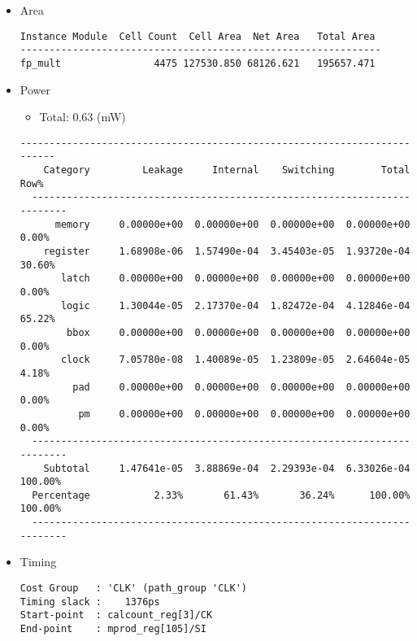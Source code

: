 \documentclass{article}
\begin{document}
            \begin{itemize}
                \item Area
                \begin{lstlisting}[backgroundcolor = \color{white},basicstyle=\small\sffamily]
Instance Module  Cell Count  Cell Area  Net Area   Total Area 
--------------------------------------------------------------
fp_mult                4475 127530.850 68126.621   195657.471 
                \end{lstlisting}
                \item Power
                \begin{itemize}
                    \item Total: 0.63 (mW)
                \end{itemize}
                \begin{lstlisting}[backgroundcolor = \color{white},basicstyle=\small\sffamily]
  -------------------------------------------------------------------------
    Category         Leakage     Internal    Switching        Total    Row%
  -------------------------------------------------------------------------
      memory     0.00000e+00  0.00000e+00  0.00000e+00  0.00000e+00   0.00%
    register     1.68908e-06  1.57490e-04  3.45403e-05  1.93720e-04  30.60%
       latch     0.00000e+00  0.00000e+00  0.00000e+00  0.00000e+00   0.00%
       logic     1.30044e-05  2.17370e-04  1.82472e-04  4.12846e-04  65.22%
        bbox     0.00000e+00  0.00000e+00  0.00000e+00  0.00000e+00   0.00%
       clock     7.05780e-08  1.40089e-05  1.23809e-05  2.64604e-05   4.18%
         pad     0.00000e+00  0.00000e+00  0.00000e+00  0.00000e+00   0.00%
          pm     0.00000e+00  0.00000e+00  0.00000e+00  0.00000e+00   0.00%
  -------------------------------------------------------------------------
    Subtotal     1.47641e-05  3.88869e-04  2.29393e-04  6.33026e-04 100.00%
  Percentage           2.33%       61.43%       36.24%      100.00% 100.00%
  -------------------------------------------------------------------------
                \end{lstlisting}
                \item Timing
                \begin{lstlisting}[backgroundcolor = \color{white},basicstyle=\small\sffamily]
Cost Group   : 'CLK' (path_group 'CLK')
Timing slack :    1376ps 
Start-point  : calcount_reg[3]/CK
End-point    : mprod_reg[105]/SI
                \end{lstlisting}
            \end{itemize}
\end{document}

